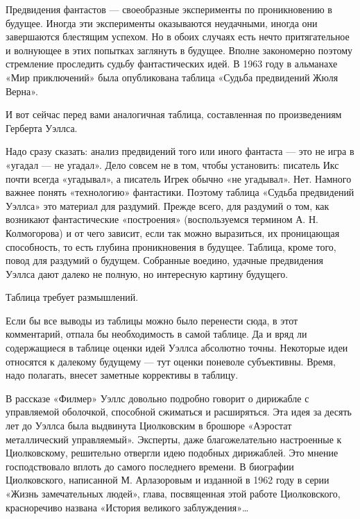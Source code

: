 Предвидения фантастов  —  своеобразные  эксперименты  по  проникновению  в
будущее.  Иногда  эти  эксперименты  оказываются  неудачными,  иногда  они
завершаются  блестящим   успехом.   Но   в  обоих   случаях   есть   нечто
притягательное и волнующее  в этих попытках  заглянуть в будущее.  Вполне
закономерно поэтому стремление  проследить судьбу  фантастических идей.  В
1963 году в альманахе «Мир приключений» была опубликована таблица  «Судьба
предвидений Жюля Верна».

И вот сейчас перед вами аналогичная таблица, составленная по произведениям
Герберта Уэллса.

Надо сразу сказать: анализ  предвидений того или иного  фантаста — это  не
игра в  «угадал —  не угадал».  Дело совсем  не в  том, чтобы  установить:
писатель  Икс  почти  всегда  «угадывал»,  а  писатель  Игрек  обычно  «не
угадывал». Нет.  Намного важнее  понять «технологию»  фантастики.  Поэтому
таблица «Судьба  предвидений Уэллса»  это  материал для  раздумий.  Прежде
всего, для  раздумий  о  том, как  возникают  фантастические  «построения»
(воспользуемся термином А.  Н. Колмогорова)  и от чего  зависит, если  так
можно  выразиться,   их   проницающая   способность,   то   есть   глубина
проникновения в  будущее.  Таблица,  кроме  того,  повод  для  раздумий  о
будущем. Собранные  воедино, удачные  предвидения  Уэллса дают  далеко  не
полную, но интересную картину будущего.

Таблица требует размышлений.

Если  бы  все  выводы  из  таблицы  можно  было  перенести  сюда,  в  этот
комментарий, отпала  бы  необходимость  в  самой таблице.  Да  и  вряд  ли
содержащиеся в таблице оценки идей Уэллса абсолютно точны. Некоторые  идеи
относятся к далекому  будущему — тут  оценки поневоле субъективны.  Время,
надо полагать, внесет заметные коррективы в таблицу.

В  рассказе  «Филмер»  Уэллс  довольно  подробно  говорит  о  дирижабле  с
управляемой оболочкой,  способной сжиматься  и  расширяться. Эта  идея  за
десять лет  до  Уэллса  была выдвинута  Циолковским  в  брошюре  «Аэростат
металлический управляемый». Эксперты,  даже благожелательно настроенные  к
Циолковскому, решительно  отвергли идею  подобных дирижаблей.  Это  мнение
господствовало  вплоть   до  самого   последнего  времени.   В   биографии
Циолковского, написанной М.  Арлазоровым и  изданной в 1962  году в  серии
«Жизнь замечательных людей», глава, посвященная этой работе  Циолковского,
красноречиво названа «История великого заблуждения»…

